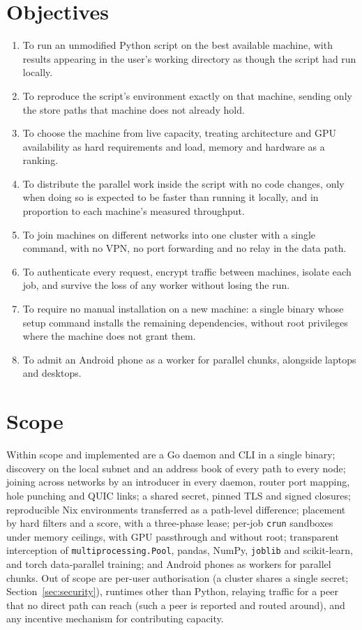 \section{Objectives}

\begin{enumerate}[leftmargin=*, label=\arabic*.]
  \item To run an unmodified Python script on the best available machine, with
  results appearing in the user's working directory as though the script had
  run locally.
  \item To reproduce the script's environment exactly on that machine, sending
  only the store paths that machine does not already hold.
  \item To choose the machine from live capacity, treating architecture and GPU
  availability as hard requirements and load, memory and hardware as a ranking.
  \item To distribute the parallel work inside the script with no code changes,
  only when doing so is expected to be faster than running it locally, and in
  proportion to each machine's measured throughput.
  \item To join machines on different networks into one cluster with a single
  command, with no VPN, no port forwarding and no relay in the data path.
  \item To authenticate every request, encrypt traffic between machines, isolate
  each job, and survive the loss of any worker without losing the run.
  \item To require no manual installation on a new machine: a single binary
  whose setup command installs the remaining dependencies, without root
  privileges where the machine does not grant them.
  \item To admit an Android phone as a worker for parallel chunks, alongside
  laptops and desktops.
\end{enumerate}

\section{Scope}

Within scope and implemented are a Go daemon and CLI in a single binary; discovery
on the local subnet and an address book of every path to every node; joining
across networks by an introducer in every daemon, router port mapping, hole
punching and QUIC links; a shared secret, pinned TLS and signed closures;
reproducible Nix environments transferred as a path-level difference; placement
by hard filters and a score, with a three-phase lease; per-job \texttt{crun}
sandboxes under memory ceilings, with GPU passthrough and without root;
transparent interception of \texttt{multiprocessing.Pool}, pandas, NumPy,
\texttt{joblib} and scikit-learn, and torch data-parallel training; and Android
phones as workers for parallel chunks. Out of scope are per-user authorisation (a cluster shares a single secret;
Section~\ref{sec:security}), runtimes other than Python, relaying traffic for a
peer that no direct path can reach (such a peer is reported and routed around),
and any incentive mechanism for contributing capacity.

